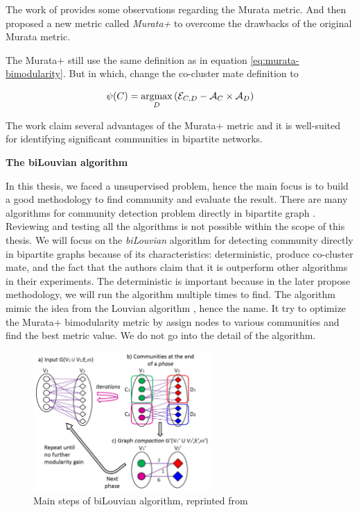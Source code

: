 The work of \parencite{pesantez2018} provides some observations regarding the Murata metric.
And then proposed a new metric called \textit{Murata+} to overcome the drawbacks of the original Murata metric.

The Murata+ still use the same definition as in equation \ref{eq:murata-bimodularity}.
But in which, change the co-cluster mate definition to

\begin{equation}
	\psi(C) = \operatorname*{argmax}_D \left(\mathcal{E}_{C, D} - \mathcal{A}_C \times \mathcal{A}_D\right)
\end{equation}

The work claim several advantages of the Murata+ metric and it is well-suited for identifying significant communities in bipartite networks.

\textbf{The biLouvian algorithm}

In this thesis, we faced a unsupervised problem, hence the main focus is to build a good methodology to find community and evaluate the result.
There are many algorithms for community detection problem directly in bipartite graph \parencite{pesantez2018}.
Reviewing and testing all the algorithms is not possible within the scope of this thesis.
We will focus on the \textit{biLouvian} algorithm \parencite{pesantez2018} for detecting community directly in bipartite graphs
because of its characteristics: deterministic, produce co-cluster mate,
and the fact that the authors claim that it is outperform other algorithms in their experiments.
The deterministic is important because in the later propose methodology,
we will run the algorithm multiple times to find.
The algorithm mimic the idea from the Louvian algorithm \parencite{blondel2008}, hence the name.
It try to optimize the Murata+ bimodularity metric by assign nodes to various communities and find the best metric value.
We do not go into the detail of the algorithm.


\begin{figure}[H]
	\centering
	\includegraphics[width=0.6\textwidth]{images/biLouvian-algorithm.png}
	\caption{Main steps of biLouvian algorithm, reprinted from \parencite{pesantez2018}}
	\label{fig:biLouvian-algorithm}
\end{figure}



